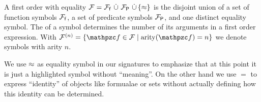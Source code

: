 
\begin{definition}\label{def:signature}
A
first order
 with equality
\( \mathcal{F} = {\mathcal{F}_{\mathsf{f}}}\,\mathop{\dot\cup}\,{\mathcal{F}_{\mathsf{P}}}\,\mathop{\dot\cup}\,\{\approx\} \)
is the disjoint union of
a set of {\myem function symbols} \( {\mathcal{F}_{\mathsf{f}}} \),
a set of {\myem predicate symbols} \( {\mathcal{F}_{\mathsf{P}}} \),
and one distinct equality symbol.
%
The  of a symbol determines the number of its arguments in a first order expression.
With \( \mcFn = \{ \mcf\in\mcF \mid \arity(\mcf) = n \} \) we denote symbols with arity \( n \).
\end{definition}

\begin{remark}
    We use \( \approx \) as equality symbol in our signatures to emphasize
    that at this point it is just a highlighted symbol
    without “meaning”.
    On the other hand we use \( = \) to express “identity” of objects
    like formualae or sets
    without actually defining how this identity can be determined.
\end{remark}

